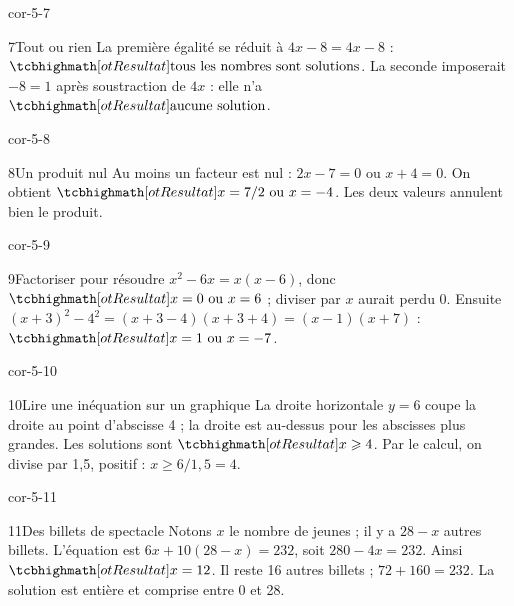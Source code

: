 \begin{blocLivre}{cor-5-7}\begin{corrige}{7}{Tout ou rien}
La première égalité se réduit à $4x-8=4x-8$ : $\res{\text{tous les nombres sont solutions}}$. La seconde imposerait $-8=1$ après soustraction de $4x$ : elle n’a $\res{\text{aucune solution}}$.
\end{corrige}\end{blocLivre}
\begin{blocLivre}{cor-5-8}\begin{corrige}{8}{Un produit nul}
Au moins un facteur est nul : $2x-7=0$ ou $x+4=0$. On obtient $\res{x=7/2\text{ ou }x=-4}$. Les deux valeurs annulent bien le produit.
\end{corrige}\end{blocLivre}
\begin{blocLivre}{cor-5-9}\begin{corrige}{9}{Factoriser pour résoudre}
$x^2-6x=x(x-6)$, donc $\res{x=0\text{ ou }x=6}$ ; diviser par $x$ aurait perdu 0. Ensuite $(x+3)^2-4^2=(x+3-4)(x+3+4)=(x-1)(x+7)$ : $\res{x=1\text{ ou }x=-7}$.
\end{corrige}\end{blocLivre}
\begin{blocLivre}{cor-5-10}\begin{corrige}{10}{Lire une inéquation sur un graphique}
La droite horizontale $y=6$ coupe la droite au point d’abscisse 4 ; la droite est au-dessus pour les abscisses plus grandes. Les solutions sont $\res{x\ge4}$. Par le calcul, on divise par 1,5, positif : $x\ge6/1{,}5=4$.
\label{fig-cor-5-10}
\end{corrige}\end{blocLivre}
\begin{blocLivre}{cor-5-11}\begin{corrige}{11}{Des billets de spectacle}
Notons $x$ le nombre de jeunes ; il y a $28-x$ autres billets. L’équation est $6x+10(28-x)=232$, soit $280-4x=232$. Ainsi $\res{x=12}$. Il reste 16 autres billets ; $72+160=232$. La solution est entière et comprise entre 0 et 28.
\end{corrige}\end{blocLivre}
